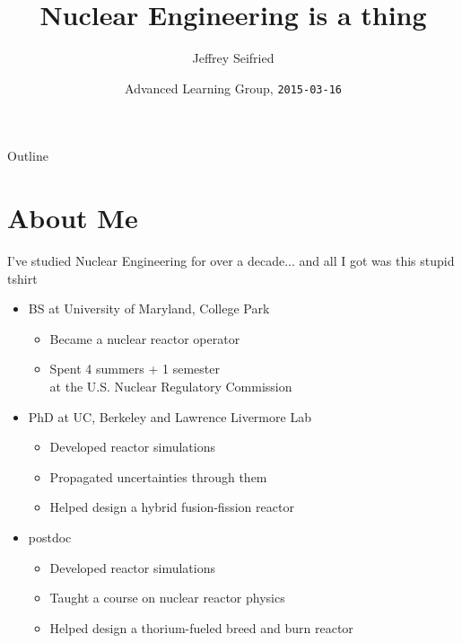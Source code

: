 \documentclass{beamer}
\title{Nuclear Engineering is a thing}
\author{Jeffrey Seifried}
\institute{Ad Delivery Team, Yelp}
\date{Advanced Learning Group, \texttt{2015-03-16}}
\begin{document}
\begin{frame}
  \titlepage
\end{frame}

\begin{frame}{Outline}
  \tableofcontents
\end{frame}


\section{About Me}

    \begin{frame}{I've studied Nuclear Engineering for over a decade}{... and all I got was this stupid tshirt}

        \begin{itemize}

            \item BS at University of Maryland, College Park
            \begin{itemize}
                \item Became a nuclear reactor operator
                \item Spent 4 summers + 1 semester \\ at the U.S. Nuclear Regulatory Commission
            \end{itemize}

            \pause

            \item PhD at UC, Berkeley and Lawrence Livermore Lab
            \begin{itemize}
                \item Developed reactor simulations
                \item Propagated uncertainties through them
                \item Helped design a hybrid fusion-fission reactor
            \end{itemize}

            \pause

            \item postdoc
            \begin{itemize}
                \item Developed reactor simulations
                \item Taught a course on nuclear reactor physics
                \item Helped design a thorium-fueled breed and burn reactor
            \end{itemize}
        \end{itemize}

    \end{frame}
\end{document}
